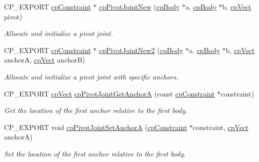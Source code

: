 \begin{DoxyCompactItemize}
\mbox{\label{group__cpPivotJoint_ga6070a5e16046606d758fbb2ffd48e0cc}} 
C\+P\+\_\+\+E\+X\+P\+O\+RT \hyperlink{structcpConstraint}{cp\+Constraint} $\ast$ \hyperlink{group__cpPivotJoint_ga6070a5e16046606d758fbb2ffd48e0cc}{cp\+Pivot\+Joint\+New} (\hyperlink{structcpBody}{cp\+Body} $\ast$a, \hyperlink{structcpBody}{cp\+Body} $\ast$b, \hyperlink{structcpVect}{cp\+Vect} pivot)
\begin{DoxyCompactList}\small\item\em Allocate and initialize a pivot joint. \end{DoxyCompactList}\item 
\mbox{\label{group__cpPivotJoint_gaac553e9f5d72e9a252a48b6336b5906a}} 
C\+P\+\_\+\+E\+X\+P\+O\+RT \hyperlink{structcpConstraint}{cp\+Constraint} $\ast$ \hyperlink{group__cpPivotJoint_gaac553e9f5d72e9a252a48b6336b5906a}{cp\+Pivot\+Joint\+New2} (\hyperlink{structcpBody}{cp\+Body} $\ast$a, \hyperlink{structcpBody}{cp\+Body} $\ast$b, \hyperlink{structcpVect}{cp\+Vect} anchorA, \hyperlink{structcpVect}{cp\+Vect} anchorB)
\begin{DoxyCompactList}\small\item\em Allocate and initialize a pivot joint with specific anchors. \end{DoxyCompactList}\item 
\mbox{\label{group__cpPivotJoint_ga76c5b8adbe7e10fdaf7dfc9866a8f931}} 
C\+P\+\_\+\+E\+X\+P\+O\+RT \hyperlink{structcpVect}{cp\+Vect} \hyperlink{group__cpPivotJoint_ga76c5b8adbe7e10fdaf7dfc9866a8f931}{cp\+Pivot\+Joint\+Get\+AnchorA} (const \hyperlink{structcpConstraint}{cp\+Constraint} $\ast$constraint)
\begin{DoxyCompactList}\small\item\em Get the location of the first anchor relative to the first body. \end{DoxyCompactList}\item 
\mbox{\label{group__cpPivotJoint_ga316f028e556a996079c877535f6bf62a}} 
C\+P\+\_\+\+E\+X\+P\+O\+RT void \hyperlink{group__cpPivotJoint_ga316f028e556a996079c877535f6bf62a}{cp\+Pivot\+Joint\+Set\+AnchorA} (\hyperlink{structcpConstraint}{cp\+Constraint} $\ast$constraint, \hyperlink{structcpVect}{cp\+Vect} anchorA)
\begin{DoxyCompactList}\small\item\em Set the location of the first anchor relative to the first body. \end{DoxyCompactList}\item 

\end{DoxyCompactItemize}
